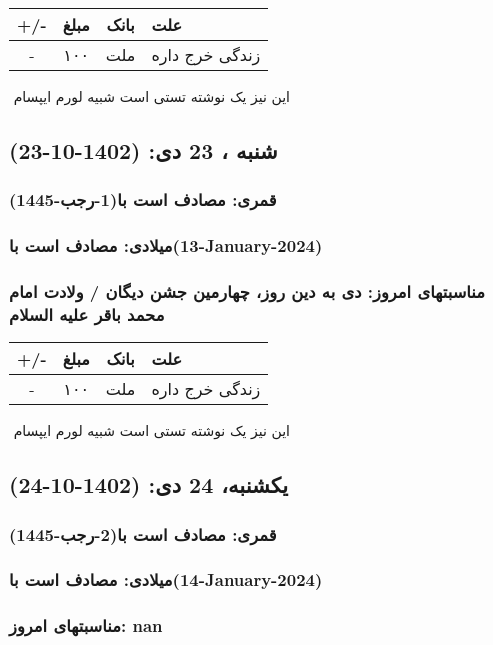 \documentclass{article}
\newcommand{\rnote}[1]{\marginpar{\textcolor{color}{\StrSubstitute{\##1}{ }{\_}}}}
\newcommand{\myRow}[4]{
    #1 & #2 & #3 & #4 \\ \hline
}
\begin{document}
\begin{tabular}{ | c | c | c | p{5cm} |}
    \hline
    \myRow{ +/- }{مبلغ}{بانک}{علت}
    \myRow{-}{۱۰۰}{ملت}{زندگی خرج داره}
\end{tabular}
\newline
\newline

‌
\rnote{تست}
این نیز یک نوشته تستی است شبیه لورم ایپسام




\newpage
{}
\textcolor{color}{
\section{ شنبه ، 23 دی: (1402-10-23) }
\subsubsection*{قمری: مصادف است با(1-رجب-1445)} 
\subsubsection*{میلادی: مصادف است با(13-January-2024)}
\subsubsection*{مناسبتهای امروز: دی به دین روز، چهارمین جشن دیگان / ولادت امام محمد باقر علیه السلام}
}


\begin{tabular}{ | c | c | c | p{5cm} |}
    \hline
    \myRow{ +/- }{مبلغ}{بانک}{علت}
    \myRow{-}{۱۰۰}{ملت}{زندگی خرج داره}
\end{tabular}
\newline
\newline

‌
\rnote{تست}
این نیز یک نوشته تستی است شبیه لورم ایپسام




\newpage
{}
\textcolor{color}{
\section{ یکشنبه، 24 دی: (1402-10-24) }
\subsubsection*{قمری: مصادف است با(2-رجب-1445)} 
\subsubsection*{میلادی: مصادف است با(14-January-2024)}
\subsubsection*{مناسبتهای امروز: nan}
}
\end{document}

